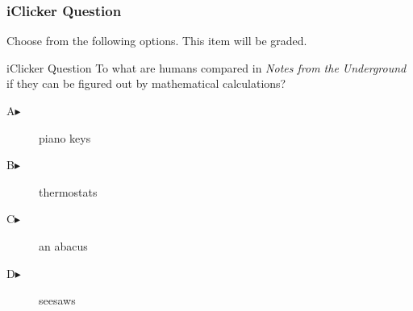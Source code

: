 \begin{frame}
  \frametitle{iClicker Question}
Choose from the following options. This item will be graded.
\begin{block}{iClicker Question}
  To what are humans compared in \emph{Notes from the Underground} if
  they can be figured out by mathematical calculations?
\end{block}
\begin{description}
\item[A\hspace{.2in}$\blacktriangleright$] piano keys
\item[B\hspace{.2in}$\blacktriangleright$] thermostats
\item[C\hspace{.2in}$\blacktriangleright$] an abacus
\item[D\hspace{.2in}$\blacktriangleright$] seesaws
\end{description}
\end{frame}
